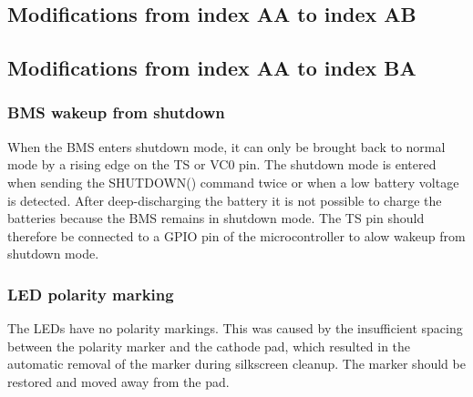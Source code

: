 \FloatBarrier

\subsection{Modifications from index AA to index AB}

\subsection{Modifications from index AA to index BA}

\subsubsection{BMS wakeup from shutdown}
When the BMS enters shutdown mode, it can only be brought back to normal mode by a rising edge on the TS or VC0 pin. The shutdown mode is entered when sending the SHUTDOWN() command twice or when a low battery voltage is detected. After deep-discharging the battery it is not possible to charge the batteries because the BMS remains in shutdown mode. The TS pin should therefore be connected to a GPIO pin of the microcontroller to alow wakeup from shutdown mode. 

\subsubsection{LED polarity marking}
The LEDs have no polarity markings. This was caused by the insufficient spacing between the polarity marker and the cathode pad, which resulted in the automatic removal of the marker during silkscreen cleanup. The marker should be restored and moved away from the pad. 
